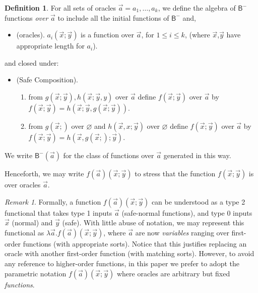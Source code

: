 \documentclass[manuscript,screen]{acmart}
\renewcommand{\emptyset}{\varnothing}
\theoremstyle{definition}
\newtheorem{defn}[thm]{Definition}
\theoremstyle{remark}
\newtheorem{rem}[thm]{Remark}
\renewcommand{\succ}[1]{\mathsf{s}_{#1}}
\newcommand{\bc}{\mathsf{B}}
\newcommand{\bcnorec}{\bc^{-}}
\begin{document}
\begin{defn}\label{defn:oracles-functions}
For all sets of oracles $\vec a = a_1, \dots, a_k$, we define the algebra of $\bcnorec$ functions \emph{over} $\vec a$ to include all the initial functions of $\bcnorec$ and,
\begin{itemize}
    \item (oracles). $a_i(\vec x;\vec y)$ is a function over $\vec a$, for $1\leq i\leq k$, (where $\vec x$,$\vec y$ have appropriate length for $a_i$).
\end{itemize}
and closed under:
\begin{itemize}
    \item (Safe Composition). 
    \begin{enumerate}[(1)]
        \item \label{enum:safe-composition-condition-1} from $g(\vec x;\vec y), h(\vec x;\vec y,y)$ over $\vec a$ define $f(\vec x;\vec y)$ over $\vec a$  by $f(\vec x;\vec y) = h(\vec x; \vec y, g(\vec x;\vec y))$.
        \item \label{enum:safe-composition-condition} from $g(\vec x;)$ over $\emptyset$ and $h(\vec x, x;\vec y) $ over $\emptyset$ define $f(\vec x; \vec y)$ over $\vec a$ by $f(\vec x; \vec y) = h(\vec x, g(\vec x;); \vec y)$.
    \end{enumerate}
\end{itemize}
We write $\bcnorec(\vec a)$ for the class of functions over $\vec a$ generated in this way.
\end{defn}


Henceforth, we may write $f(\vec a)(\vec x; \vec y)$ to stress that the function $f(\vec x; \vec y)$ is over oracles $\vec a$.

\begin{rem}\label{rem:variables-vs-functions}
Formally, a function $f(\vec a)(\vec x; \vec y)$ can be understood as a type 2 functional that takes type 1 inputs $\vec a$ (safe-normal functions), and type 0 inputs $\vec x$ (normal) and $\vec y$ (safe). With little abuse of notation, we may represent this functional as $\lambda \vec a. f(\vec a)(\vec x; \vec y)$, where $\vec a$ are now \emph{variables} ranging over first-order functions (with appropriate sorts). Notice that this justifies replacing an oracle with another first-order function (with matching sorts). However, to avoid any reference to higher-order functions, in this paper we prefer to adopt the parametric notation $f(\vec a)(\vec x; \vec y)$ where oracles are arbitrary but fixed \emph{functions}. 
\end{rem}
\end{document}
